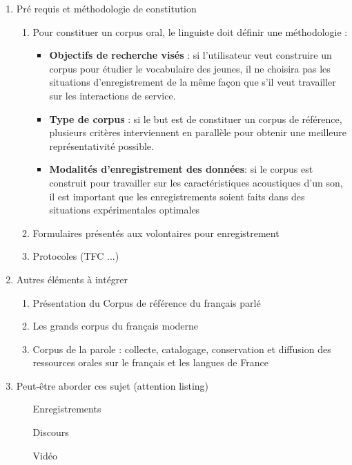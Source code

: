\documentclass{book}
\begin{document}
\begin{enumerate}
\item Pré requis et méthodologie de constitution
    \begin{enumerate}
        \item Pour constituer un corpus oral, le linguiste doit définir une méthodologie :
        \begin{itemize}
            \item \textbf{Objectifs de recherche visés }: si l’utilisateur veut construire un
                  corpus pour étudier le vocabulaire des jeunes, il ne choisira pas les
                  situations d’enregistrement de la même façon que s’il veut travailler
                  sur les interactions de service.
            \item \textbf{Type de corpus} : si le but est de constituer un corpus de référence,
                  plusieurs critères interviennent en parallèle pour obtenir une meilleure
                  représentativité possible.
            \item \textbf{Modalités d’enregistrement des données}: si le corpus est
                  construit pour travailler sur les caractéristiques acoustiques d’un son,
                  il est important que les enregistrements soient faits dans des situations
                  expérimentales optimales
        \end{itemize}
        \item Formulaires présentés aux volontaires pour enregistrement
        \item Protocoles (TFC ...)
        \end{enumerate}
\item Autres éléments à intégrer
    \begin{enumerate}
        \item Présentation du Corpus de référence du français parlé \autocite{delic:halshs-01388193}
        \item Les grands corpus du français moderne \autocite{wissner:hal-03604977}
        \item Corpus de la parole : collecte, catalogage, conservation et diffusion des ressources orales sur le français et les langues de France \autocite{jacobson:halshs-01165884}
    \end{enumerate}
\item Peut-être aborder ces sujet (attention listing)
    \begin{enumerate}
	   \item [Enregistrements]
	   \item [Discours]
	   \item[Vidéo]
    \end{enumerate}
\end{enumerate}
\end{document}
